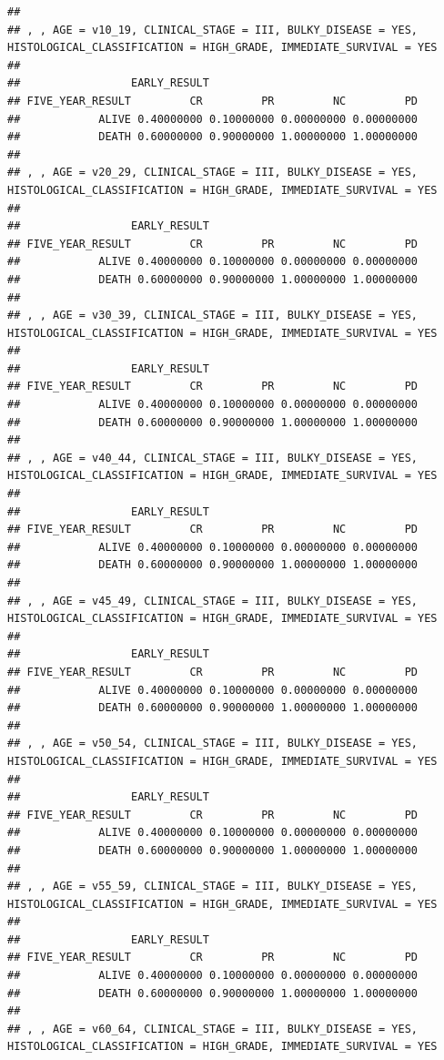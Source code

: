 \documentclass[]{article}
\begin{document}
\begin{verbatim}
## 
## , , AGE = v10_19, CLINICAL_STAGE = III, BULKY_DISEASE = YES, HISTOLOGICAL_CLASSIFICATION = HIGH_GRADE, IMMEDIATE_SURVIVAL = YES
## 
##                 EARLY_RESULT
## FIVE_YEAR_RESULT         CR         PR         NC         PD
##            ALIVE 0.40000000 0.10000000 0.00000000 0.00000000
##            DEATH 0.60000000 0.90000000 1.00000000 1.00000000
## 
## , , AGE = v20_29, CLINICAL_STAGE = III, BULKY_DISEASE = YES, HISTOLOGICAL_CLASSIFICATION = HIGH_GRADE, IMMEDIATE_SURVIVAL = YES
## 
##                 EARLY_RESULT
## FIVE_YEAR_RESULT         CR         PR         NC         PD
##            ALIVE 0.40000000 0.10000000 0.00000000 0.00000000
##            DEATH 0.60000000 0.90000000 1.00000000 1.00000000
## 
## , , AGE = v30_39, CLINICAL_STAGE = III, BULKY_DISEASE = YES, HISTOLOGICAL_CLASSIFICATION = HIGH_GRADE, IMMEDIATE_SURVIVAL = YES
## 
##                 EARLY_RESULT
## FIVE_YEAR_RESULT         CR         PR         NC         PD
##            ALIVE 0.40000000 0.10000000 0.00000000 0.00000000
##            DEATH 0.60000000 0.90000000 1.00000000 1.00000000
## 
## , , AGE = v40_44, CLINICAL_STAGE = III, BULKY_DISEASE = YES, HISTOLOGICAL_CLASSIFICATION = HIGH_GRADE, IMMEDIATE_SURVIVAL = YES
## 
##                 EARLY_RESULT
## FIVE_YEAR_RESULT         CR         PR         NC         PD
##            ALIVE 0.40000000 0.10000000 0.00000000 0.00000000
##            DEATH 0.60000000 0.90000000 1.00000000 1.00000000
## 
## , , AGE = v45_49, CLINICAL_STAGE = III, BULKY_DISEASE = YES, HISTOLOGICAL_CLASSIFICATION = HIGH_GRADE, IMMEDIATE_SURVIVAL = YES
## 
##                 EARLY_RESULT
## FIVE_YEAR_RESULT         CR         PR         NC         PD
##            ALIVE 0.40000000 0.10000000 0.00000000 0.00000000
##            DEATH 0.60000000 0.90000000 1.00000000 1.00000000
## 
## , , AGE = v50_54, CLINICAL_STAGE = III, BULKY_DISEASE = YES, HISTOLOGICAL_CLASSIFICATION = HIGH_GRADE, IMMEDIATE_SURVIVAL = YES
## 
##                 EARLY_RESULT
## FIVE_YEAR_RESULT         CR         PR         NC         PD
##            ALIVE 0.40000000 0.10000000 0.00000000 0.00000000
##            DEATH 0.60000000 0.90000000 1.00000000 1.00000000
## 
## , , AGE = v55_59, CLINICAL_STAGE = III, BULKY_DISEASE = YES, HISTOLOGICAL_CLASSIFICATION = HIGH_GRADE, IMMEDIATE_SURVIVAL = YES
## 
##                 EARLY_RESULT
## FIVE_YEAR_RESULT         CR         PR         NC         PD
##            ALIVE 0.40000000 0.10000000 0.00000000 0.00000000
##            DEATH 0.60000000 0.90000000 1.00000000 1.00000000
## 
## , , AGE = v60_64, CLINICAL_STAGE = III, BULKY_DISEASE = YES, HISTOLOGICAL_CLASSIFICATION = HIGH_GRADE, IMMEDIATE_SURVIVAL = YES

\end{verbatim}
\end{document}
